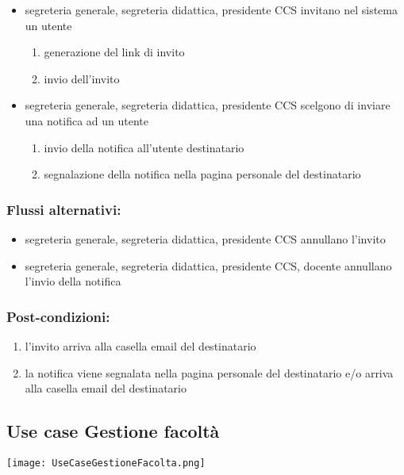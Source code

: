 \documentclass[11pt,a4paper]{article}
\begin{document}
\begin{itemize}
 \item segreteria generale, segreteria didattica, presidente CCS invitano nel sistema un utente
\begin{enumerate}
 \item generazione del link di invito
\item invio dell'invito
\end{enumerate}
\item segreteria generale, segreteria didattica, presidente CCS scelgono di inviare una notifica ad un utente
\begin{enumerate}
 \item invio della notifica all'utente destinatario
 \item segnalazione della notifica nella pagina personale del destinatario
\end{enumerate}
\end{itemize}
\subsubsection*{Flussi alternativi:}
\begin{itemize}
 \item segreteria generale, segreteria didattica, presidente CCS annullano l'invito
\item  segreteria generale, segreteria didattica, presidente CCS, docente annullano l'invio della notifica
\end{itemize}
\subsubsection*{Post-condizioni:}
\begin{enumerate}
 \item l'invito arriva alla casella email del destinatario
 \item la notifica viene segnalata nella pagina personale del destinatario e/o arriva alla casella email del destinatario
\end{enumerate}

\subsection{Use case Gestione facoltà}
\begin{center} 
 \texttt{[image: UseCaseGestioneFacolta.png]}
\end{center}
\end{document}
